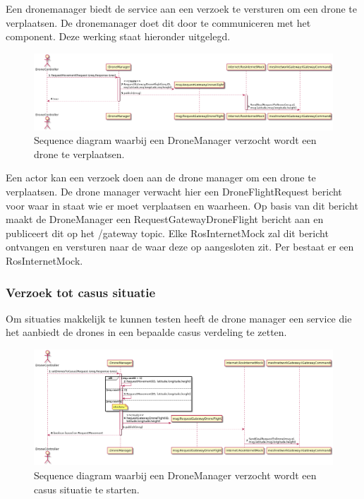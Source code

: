 \documentclass[a4paper, 11pt, oneside]{report}
\begin{document}
Een dronemanager biedt de service aan een verzoek te versturen om een drone te verplaatsen. 
De dronemanager doet dit door te communiceren met het  component.
Deze werking staat hieronder uitgelegd.

\begin{figure}[H]
	\begin{center}\includegraphics[width=.95\linewidth]{UML/out/ros/sequence/RequestDroneMovement/RequestDroneMovement.png}\end{center}
	\caption{Sequence diagram waarbij een DroneManager verzocht wordt een drone te verplaatsen.}
	\label{fig:ros:sequence:sequence:verplaatsingdrone}
\end{figure}

Een actor kan een verzoek doen aan de drone manager om een drone te verplaatsen.
De drone manager verwacht hier een DroneFlightRequest bericht voor waar in staat wie er moet verplaatsen en waarheen.
Op basis van dit bericht maakt de DroneManager een RequestGatewayDroneFlight bericht aan en publiceert dit op het /gateway topic.
Elke RosInternetMock zal dit bericht ontvangen en versturen naar de  waar deze op aangesloten zit.
Per  bestaat er een RosInternetMock.

\subsubsection{Verzoek tot casus situatie}
\label{DetailedDesign:ros:sequence:casus}

Om situaties makkelijk te kunnen testen heeft de drone manager een service die het aanbiedt de drones in een bepaalde casus verdeling te zetten.

\begin{figure}[H]
	\begin{center}\includegraphics[width=.95\linewidth]{UML/out/ros/sequence/CasusRequest/CasusRequest.png}\end{center}
	\caption{Sequence diagram waarbij een DroneManager verzocht wordt een casus situatie te starten.}
	\label{fig:ros:sequence:sequence:casus}
\end{figure}
\end{document}
